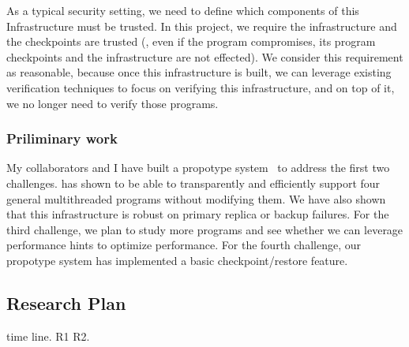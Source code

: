 As a typical security setting, we need to define which components of 
this Infrastructure must be trusted. In this project, we require the 
infrastructure and the checkpoints are trusted (\ie, even if the program 
compromises, its program checkpoints and the infrastructure are not effected). 
We consider this requirement as reasonable, because once this infrastructure is 
built, we can leverage existing verification techniques to focus on verifying 
this infrastructure, and on top of it, we no longer need to verify those 
programs.





\subsubsection{Priliminary work} \label{sec:defense-result}

My collaborators and I have built a propotype system~\cite{crane:sosp15} to 
address the first two challenges. \crane has shown to be able to transparently 
and efficiently support four general multithreaded programs without modifying 
them. We have also shown that this infrastructure is robust on primary replica 
or backup failures. For the third challenge, we plan to study more 
programs and see whether we can leverage performance hints to optimize 
performance. For the fourth challenge, our propotype system \crane has 
implemented a basic checkpoint/restore feature.

\subsection{Research Plan} \label{sec:rep}
time line. R1 R2.


